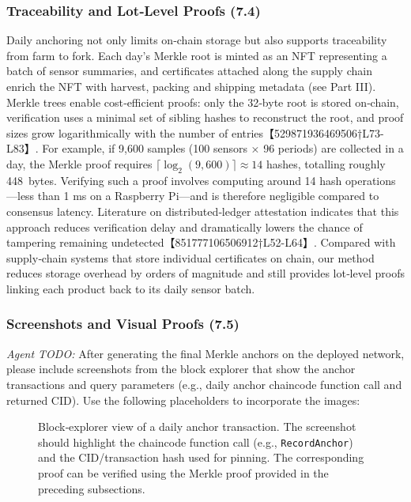 \subsubsection{Traceability and Lot‑Level Proofs (7.4)}
Daily anchoring not only limits on‑chain storage but also supports
traceability from farm to fork.  Each day’s Merkle root is minted as an
NFT representing a batch of sensor summaries, and certificates attached
along the supply chain enrich the NFT with harvest, packing and shipping
metadata (see Part III).  Merkle trees enable cost‑efficient proofs: only
the 32‑byte root is stored on‑chain, verification uses a minimal set of
sibling hashes to reconstruct the root, and proof sizes grow
logarithmically with the number of entries【529871936469506†L73-L83】.  For
example, if 9{,}600 samples (100 sensors × 96 periods) are collected in a
day, the Merkle proof requires \(\lceil\log_2(9{,}600)\rceil \approx 14\)
hashes, totalling roughly 448~bytes.  Verifying such a proof involves
computing around 14 hash operations—less than 1 ms on a Raspberry Pi—and is
therefore negligible compared to consensus latency.  Literature on
distributed‑ledger attestation indicates that this approach reduces
verification delay and dramatically lowers the chance of tampering
remaining undetected【851777106506912†L52-L64】.  Compared with supply‑chain
systems that store individual certificates on chain, our method reduces
storage overhead by orders of magnitude and still provides lot‑level
proofs linking each product back to its daily sensor batch.

\subsubsection{Screenshots and Visual Proofs (7.5)}
\textit{Agent TODO:} After generating the final Merkle anchors on the deployed
network, please include screenshots from the block explorer that show the
anchor transactions and query parameters (e.g., daily anchor chaincode
function call and returned CID).  Use the following placeholders to
incorporate the images:
\begin{figure}[!t]
  \centering
  \caption{Block‑explorer view of a daily anchor transaction.  The screenshot
    should highlight the chaincode function call (e.g., \texttt{RecordAnchor})
    and the CID/transaction hash used for pinning.  The corresponding proof
    can be verified using the Merkle proof provided in the preceding
    subsections.}
  \label{fig:block-explorer-anchor}
\end{figure}

